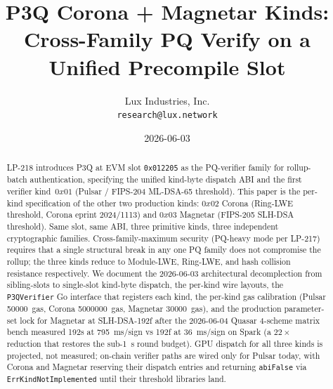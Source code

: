 \documentclass[11pt,a4paper]{article}
\title{P3Q Corona + Magnetar Kinds:\\
       Cross-Family PQ Verify on a Unified Precompile Slot}
\author{Lux Industries, Inc. \\
        \texttt{research@lux.network}}
\date{2026-06-03}
\begin{document}
\luxcoverpage

\begin{abstract}
LP-218 introduces P3Q at EVM slot \texttt{0x012205} as the
PQ-verifier family for rollup-batch authentication, specifying the
unified kind-byte dispatch ABI and the first verifier
kind~$0x01$ (Pulsar / FIPS-204 ML-DSA-65 threshold). This paper is
the per-kind specification of the other two production kinds:
$0x02$ Corona (Ring-LWE threshold, Corona eprint 2024/1113) and
$0x03$ Magnetar (FIPS-205 SLH-DSA threshold). Same slot, same
ABI, three primitive kinds, three independent cryptographic
families. Cross-family-maximum security (PQ-heavy mode per LP-217)
requires that a single structural break in any one PQ family does
not compromise the rollup; the three kinds reduce to Module-LWE,
Ring-LWE, and hash collision resistance respectively. We document
the 2026-06-03 architectural decomplection from sibling-slots to
single-slot kind-byte dispatch, the per-kind wire layouts, the
\texttt{P3QVerifier} Go interface that registers each kind, the
per-kind gas calibration (Pulsar \SI{50000}{gas}, Corona
\SI{5000000}{gas}, Magnetar \SI{30000}{gas}), and the production
parameter-set lock for Magnetar at SLH-DSA-192f after the
2026-06-04 Quasar 4-scheme matrix bench measured 192s at
\SI{795}{ms}/sign vs 192f at \SI{36}{ms}/sign on Spark (a
$22\times$ reduction that restores the sub-\SI{1}{s} round
budget). GPU dispatch for all three kinds is projected, not
measured; on-chain verifier paths are wired only for Pulsar
today, with Corona and Magnetar reserving their dispatch entries
and returning \texttt{abiFalse} via \texttt{ErrKindNotImplemented}
until their threshold libraries land.
\end{abstract}

\tableofcontents
\newpage











\end{document}
